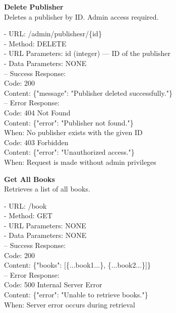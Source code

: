\begin{flushleft}
    \textbf{Delete Publisher} \\
    Deletes a publisher by ID. Admin access required.

    - URL: /admin/publishesr/\{id\} \\
    - Method: DELETE \\
    - URL Parameters: id (integer) — ID of the publisher \\
    - Data Parameters: NONE \\
    – Success Response: \\
    Code: 200 \\
    Content: \{"message": "Publisher deleted successfully."\} \\
    – Error Response: \\
    Code: 404 Not Found \\
    Content: \{"error": "Publisher not found."\} \\
    When: No publisher exists with the given ID \\
    Code: 403 Forbidden \\
    Content: \{"error": "Unauthorized access."\} \\
    When: Request is made without admin privileges
\end{flushleft}

\begin{flushleft}
    \textbf{Get All Books} \\
    Retrieves a list of all books.

    - URL: /book \\
    - Method: GET \\
    - URL Parameters: NONE \\
    - Data Parameters: NONE \\
    – Success Response: \\
    Code: 200 \\
    Content: \{"books": [\{...book1...\}, \{...book2...\}]\} \\
    – Error Response: \\
    Code: 500 Internal Server Error \\
    Content: \{"error": "Unable to retrieve books."\} \\
    When: Server error occurs during retrieval
\end{flushleft}

